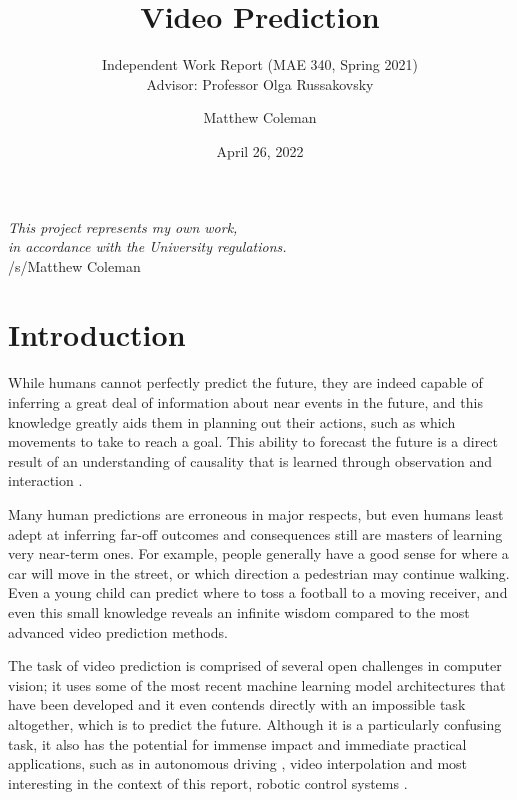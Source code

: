 \documentclass{scrartcl}
\title{Video Prediction}
\subtitle{Independent Work Report (MAE 340, Spring 2021) \\ Advisor: Professor Olga Russakovsky}
\author{Matthew Coleman}
\date{April 26, 2022}
\begin{document}
\maketitle

\vspace{8cm}
\begin{center}
	\Large \textit{This project represents my own work, \\ in accordance with the University regulations.} \\
	\vspace{0.2cm}
	\large /s/Matthew Coleman
\end{center}
\normalsize

\newpage
\tableofcontents
\newpage

\section{Introduction}
\label{sec:intro}

While humans cannot perfectly predict the future, they are indeed capable of
inferring a great deal of information about near events in the future, and this
knowledge greatly aids them in planning out their actions, such as which
movements to take to reach a goal. This ability to forecast the future is a
direct result of an understanding of causality that is learned through
observation and interaction \cite{human_learning_sequences}.

Many human predictions are erroneous in major respects, but even humans least
adept at inferring far-off outcomes and consequences still are masters of
learning very near-term ones. For example, people generally have a good sense
for where a car will move in the street, or which direction a pedestrian may
continue walking. Even a young child can predict where to toss a football to a
moving receiver, and even this small knowledge reveals an infinite wisdom
compared to the most advanced video prediction methods.

The task of video prediction is comprised of several open challenges in
computer vision; it uses some of the most recent machine learning model
architectures that have been developed and it even contends directly with an
impossible task altogether, which is to predict the future. Although it is a
particularly confusing task, it also has the potential for immense impact and
immediate practical applications, such as in autonomous driving
\cite{eg_self_driving}, video interpolation \cite{eg_video_interp} and most
interesting in the context of this report, robotic control systems
\cite{eg_robot_control}.
\end{document}
